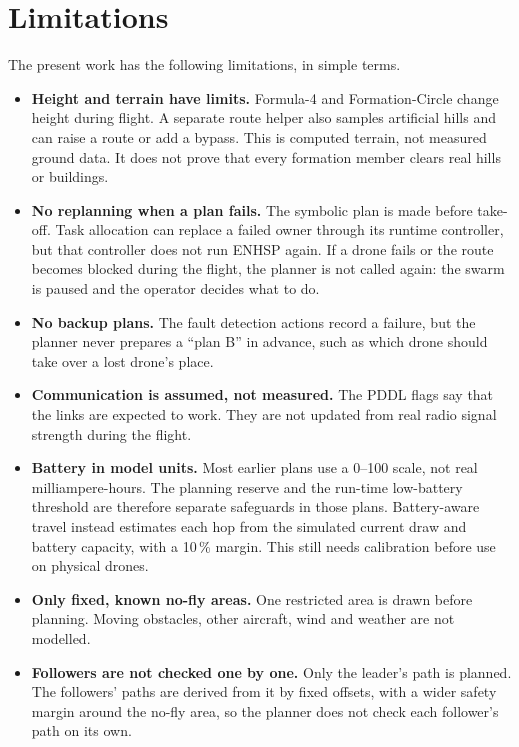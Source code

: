 \documentclass[11pt,a4paper,oneside]{report}
\begin{document}
\section{Limitations}
The present work has the following limitations, in simple terms.
\begin{itemize}[itemsep=5pt]
  \item \textbf{Height and terrain have limits.} Formula-4 and Formation-Circle change height
        during flight. A separate route helper also samples artificial hills and can raise a
        route or add a bypass. This is computed terrain, not measured ground data. It does not
        prove that every formation member clears real hills or buildings.

  \item \textbf{No replanning when a plan fails.} The symbolic plan is made before take-off. Task allocation can replace a failed owner
        through its runtime controller, but that controller does not run ENHSP again. If a
        drone fails or the route becomes blocked during the flight, the planner is not called
        again: the swarm is paused and the operator decides what to do.
  \item \textbf{No backup plans.} The fault detection actions record a failure, but the planner
        never prepares a ``plan B'' in advance, such as which drone should take over a lost
        drone's place.
  \item \textbf{Communication is assumed, not measured.} The PDDL flags say that the links are
        expected to work. They are not updated from real radio signal strength during the
        flight.
  \item \textbf{Battery in model units.} Most earlier plans use a 0--100 scale, not real
        milliampere-hours. The planning reserve and the run-time low-battery threshold are
        therefore separate safeguards in those plans. Battery-aware travel instead estimates
        each hop from the simulated current draw and battery capacity, with a 10\,\% margin.
        This still needs calibration before use on physical drones.
  \item \textbf{Only fixed, known no-fly areas.} One restricted area is drawn before planning.
        Moving obstacles, other aircraft, wind and weather are not modelled.
  \item \textbf{Followers are not checked one by one.} Only the leader's path is planned. The
        followers' paths are derived from it by fixed offsets, with a wider safety margin
        around the no-fly area, so the planner does not check each follower's path on its own.

\end{itemize}
\end{document}
